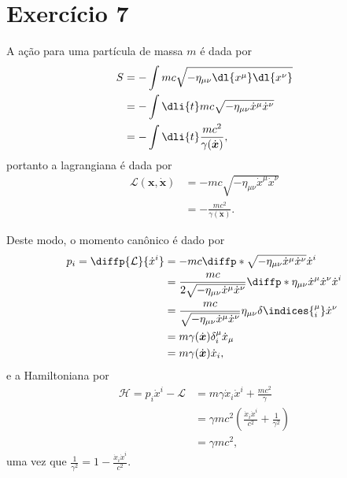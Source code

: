 \section*{Exercício 7}

A ação para uma partícula de massa \(m\) é dada por
\begin{align*}
    S &= -\int mc\sqrt{-\eta_{\mu\nu} \dl{x^\mu} \dl{x^\nu}}\\
      &= - \int \dli{t}mc \sqrt{-\eta_{\mu\nu} \dot{x}^\mu \dot{x}^\nu}\\
      &= - \int \dli{t} \frac{mc^2}{\gamma(\dot{\boldsymbol{x}})},
\end{align*}
portanto a lagrangiana é dada por
\begin{align*}
    \mathcal{L}(\boldsymbol{x}, \dot{\boldsymbol{x}}) &= - mc\sqrt{-\eta_{\mu\nu}\dot{x}^\mu\dot{x}^\nu}\\
                                        &= - \frac{mc^2}{\gamma(\dot{\boldsymbol{x}})}.
\end{align*}

Deste modo, o momento canônico é dado por
\begin{align*}
    p_i = \diffp{\mathcal{L}}{\dot{x}^i} &= -mc\diffp*{\sqrt{-\eta_{\mu\nu}\dot{x}^\mu\dot{x}^\nu}}{\dot{x}^i}\\
                                         &= \frac{mc}{2\sqrt{-\eta_{\mu\nu}\dot{x}^\mu \dot{x}^\nu}}\diffp*{\eta_{\mu\nu}\dot{x}^\mu\dot{x}^\nu}{\dot{x}^i}\\
                                         &= \frac{mc}{\sqrt{-\eta_{\mu\nu}\dot{x}^\mu\dot{x}^\nu}} \eta_{\mu\nu} \delta\indices{^\mu_i} \dot{x}^\nu\\
                                         &= m\gamma(\dot{\boldsymbol{x}}) \delta^\mu_i \dot{x}_\mu\\
                                         &= m \gamma(\dot{\boldsymbol{x}}) \dot{x}_i,
\end{align*}
e a Hamiltoniana por
\begin{align*}
    \mathcal{H} = p_i\dot{x}^i - \mathcal{L} &= m \gamma \dot{x}_i\dot{x}^i + \frac{mc^2}{\gamma}\\
                                             &=  \gamma mc^2\left(\frac{\dot{x}_i\dot{x}^i}{c^2} + \frac{1}{\gamma^2}\right)\\
                                             &= \gamma mc^2,
\end{align*}
uma vez que \(\frac{1}{\gamma^2} = 1 - \frac{\dot{x}_i\dot{x}^i}{c^2}.\)

